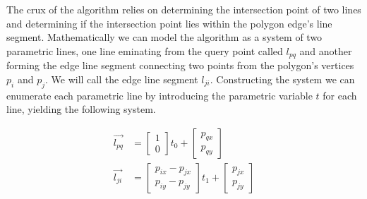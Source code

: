 \documentclass{article}
\begin{document}
The crux of the algorithm relies on determining the intersection point of two lines and determining if the intersection point lies within the polygon edge's line segment. Mathematically we can model the algorithm as a system of two parametric lines, one line eminating from the query point called $l_{pq}$ and another forming the edge line segment connecting two points from the polygon's vertices $p_i$ and $p_j$. We will call the edge line segment $l_{ji}$. Constructing the system we can enumerate each parametric line by introducing the parametric variable $t$ for each line, yielding the following system.

\begin{align*}
\vec{l_{pq}} &= \begin{bmatrix} 1 \\ 0 \end{bmatrix} t_0 + \begin{bmatrix} p_{qx} \\ p_{qy} \end{bmatrix} \\
\vec{l_{ji}} &= \begin{bmatrix} p_{ix} - p_{jx} \\ p_{iy} - p_{jy} \end{bmatrix} t_1 + \begin{bmatrix} p_{jx} \\ p_{jy} \end{bmatrix}
\end{align*}
\end{document}
